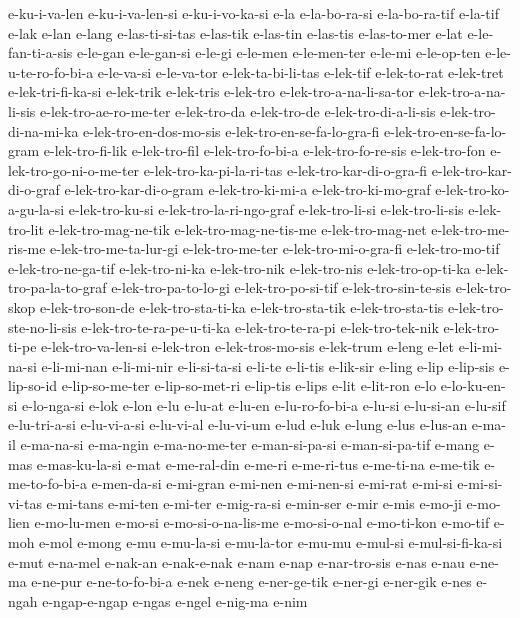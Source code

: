 {e-ku-i-va-len e-ku-i-va-len-si e-ku-i-vo-ka-si e-la e-la-bo-ra-si
e-la-bo-ra-tif e-la-tif e-lak e-lan e-lang e-las-ti-si-tas e-las-tik
e-las-tin e-las-tis e-las-to-mer e-lat e-le-fan-ti-a-sis e-le-gan
e-le-gan-si e-le-gi e-le-men e-le-men-ter e-le-mi e-le-op-ten
e-le-u-te-ro-fo-bi-a e-le-va-si e-le-va-tor e-lek-ta-bi-li-tas e-lek-tif
e-lek-to-rat e-lek-tret e-lek-tri-fi-ka-si e-lek-trik e-lek-tris e-lek-tro
e-lek-tro-a-na-li-sa-tor e-lek-tro-a-na-li-sis e-lek-tro-ae-ro-me-ter
e-lek-tro-da e-lek-tro-de e-lek-tro-di-a-li-sis e-lek-tro-di-na-mi-ka
e-lek-tro-en-dos-mo-sis e-lek-tro-en-se-fa-lo-gra-fi
e-lek-tro-en-se-fa-lo-gram e-lek-tro-fi-lik e-lek-tro-fil
e-lek-tro-fo-bi-a e-lek-tro-fo-re-sis e-lek-tro-fon
e-lek-tro-go-ni-o-me-ter e-lek-tro-ka-pi-la-ri-tas
e-lek-tro-kar-di-o-gra-fi e-lek-tro-kar-di-o-graf e-lek-tro-kar-di-o-gram
e-lek-tro-ki-mi-a e-lek-tro-ki-mo-graf e-lek-tro-ko-a-gu-la-si
e-lek-tro-ku-si e-lek-tro-la-ri-ngo-graf e-lek-tro-li-si e-lek-tro-li-sis
e-lek-tro-lit e-lek-tro-mag-ne-tik e-lek-tro-mag-ne-tis-me
e-lek-tro-mag-net e-lek-tro-me-ris-me e-lek-tro-me-ta-lur-gi
e-lek-tro-me-ter e-lek-tro-mi-o-gra-fi e-lek-tro-mo-tif
e-lek-tro-ne-ga-tif e-lek-tro-ni-ka e-lek-tro-nik e-lek-tro-nis
e-lek-tro-op-ti-ka e-lek-tro-pa-la-to-graf e-lek-tro-pa-to-lo-gi
e-lek-tro-po-si-tif e-lek-tro-sin-te-sis e-lek-tro-skop e-lek-tro-son-de
e-lek-tro-sta-ti-ka e-lek-tro-sta-tik e-lek-tro-sta-tis
e-lek-tro-ste-no-li-sis e-lek-tro-te-ra-pe-u-ti-ka e-lek-tro-te-ra-pi
e-lek-tro-tek-nik e-lek-tro-ti-pe e-lek-tro-va-len-si e-lek-tron
e-lek-tros-mo-sis e-lek-trum e-leng e-let e-li-mi-na-si e-li-mi-nan
e-li-mi-nir e-li-si-ta-si e-li-te e-li-tis e-lik-sir e-ling e-lip
e-lip-sis e-lip-so-id e-lip-so-me-ter e-lip-so-met-ri e-lip-tis e-lips
e-lit e-lit-ron e-lo e-lo-ku-en-si e-lo-nga-si e-lok e-lon e-lu e-lu-at
e-lu-en e-lu-ro-fo-bi-a e-lu-si e-lu-si-an e-lu-sif e-lu-tri-a-si
e-lu-vi-a-si e-lu-vi-al e-lu-vi-um e-lud e-luk e-lung e-lus e-lus-an
e-ma-il e-ma-na-si e-ma-ngin e-ma-no-me-ter e-man-si-pa-si e-man-si-pa-tif
e-mang e-mas e-mas-ku-la-si e-mat e-me-ral-din e-me-ri e-me-ri-tus
e-me-ti-na e-me-tik e-me-to-fo-bi-a e-men-da-si e-mi-gran e-mi-nen
e-mi-nen-si e-mi-rat e-mi-si e-mi-si-vi-tas e-mi-tans e-mi-ten e-mi-ter
e-mig-ra-si e-min-ser e-mir e-mis e-mo-ji e-mo-lien e-mo-lu-men e-mo-si
e-mo-si-o-na-lis-me e-mo-si-o-nal e-mo-ti-kon e-mo-tif e-moh e-mol e-mong
e-mu e-mu-la-si e-mu-la-tor e-mu-mu e-mul-si e-mul-si-fi-ka-si e-mut
e-na-mel e-nak-an e-nak-e-nak e-nam e-nap e-nar-tro-sis e-nas e-nau
e-ne-ma e-ne-pur e-ne-to-fo-bi-a e-nek e-neng e-ner-ge-tik e-ner-gi
e-ner-gik e-nes e-ngah e-ngap-e-ngap e-ngas e-ngel e-nig-ma e-nim
}
